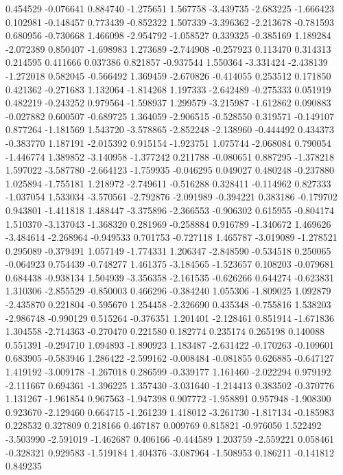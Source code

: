0.454529
-0.076641
0.884740
-1.275651
1.567758
-3.439735
-2.683225
-1.666423
0.102981
-0.148457
0.773439
-0.852322
1.507339
-3.396362
-2.213678
-0.781593
0.680956
-0.730668
1.466098
-2.954792
-1.058527
0.339325
-0.385169
1.189284
-2.072389
0.850407
-1.698983
1.273689
-2.744908
-0.257923
0.113470
0.314313
0.214595
0.411666
0.037386
0.821857
-0.937544
1.550364
-3.331424
-2.438139
-1.272018
0.582045
-0.566492
1.369459
-2.670826
-0.414055
0.253512
0.171850
0.421362
-0.271683
1.132064
-1.814268
1.197333
-2.642489
-0.275333
0.051919
0.482219
-0.243252
0.979564
-1.598937
1.299579
-3.215987
-1.612862
0.090883
-0.027882
0.600507
-0.689725
1.364059
-2.906515
-0.528550
0.319571
-0.149107
0.877264
-1.181569
1.543720
-3.578865
-2.852248
-2.138960
-0.444492
0.434373
-0.383770
1.187191
-2.015392
0.915154
-1.923751
1.075744
-2.068084
0.790054
-1.446774
1.389852
-3.140958
-1.377242
0.211788
-0.080651
0.887295
-1.378218
1.597022
-3.587780
-2.664123
-1.759935
-0.046295
0.049027
0.480248
-0.237880
1.025894
-1.755181
1.218972
-2.749611
-0.516288
0.328411
-0.114962
0.827333
-1.037054
1.533034
-3.570561
-2.792876
-2.091989
-0.394221
0.383186
-0.179702
0.943801
-1.411818
1.488447
-3.375896
-2.366553
-0.906302
0.615955
-0.804174
1.510370
-3.137043
-1.368320
0.281969
-0.258884
0.916789
-1.340672
1.469626
-3.484614
-2.268964
-0.949533
0.701753
-0.727118
1.465787
-3.019089
-1.278521
0.295089
-0.379491
1.057149
-1.774331
1.206347
-2.848590
-0.534518
0.250065
-0.064923
0.754439
-0.748277
1.461375
-3.184565
-1.523657
0.108203
-0.079681
0.684438
-0.938134
1.504939
-3.356358
-2.161535
-0.626266
0.644274
-0.623831
1.310306
-2.855529
-0.850003
0.466296
-0.384240
1.055306
-1.809025
1.092879
-2.435870
0.221804
-0.595670
1.254458
-2.326690
0.435348
-0.755816
1.538203
-2.986748
-0.990129
0.515264
-0.376351
1.201401
-2.128461
0.851914
-1.671836
1.304558
-2.714363
-0.270470
0.221580
0.182774
0.235174
0.265198
0.140088
0.551391
-0.294710
1.094893
-1.890923
1.183487
-2.631422
-0.170263
-0.109601
0.683905
-0.583946
1.286422
-2.599162
-0.008484
-0.081855
0.626885
-0.647127
1.419192
-3.009178
-1.267018
0.286599
-0.339177
1.161460
-2.022294
0.979192
-2.111667
0.694361
-1.396225
1.357430
-3.031640
-1.214413
0.383502
-0.370776
1.131267
-1.961854
0.967563
-1.947398
0.907772
-1.958891
0.957948
-1.908300
0.923670
-2.129460
0.664715
-1.261239
1.418012
-3.261730
-1.817134
-0.185983
0.228532
0.327809
0.218166
0.467187
0.009769
0.815821
-0.976050
1.522492
-3.503990
-2.591019
-1.462687
0.406166
-0.444589
1.203759
-2.559221
0.058461
-0.328321
0.929583
-1.519184
1.404376
-3.087964
-1.508953
0.186211
-0.141812
0.849235
